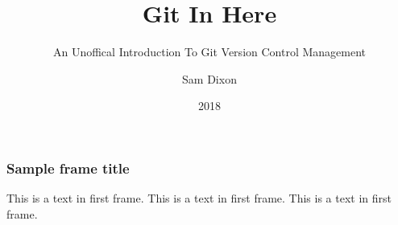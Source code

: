 \documentclass{beamer}
\title{Git In Here}
\subtitle{An Unoffical Introduction To Git Version Control Management}
\author{Sam Dixon}
\date{2018}
\begin{document}
 
\frame{\titlepage}
  
\begin{frame}

\frametitle{Sample frame title}
  This is a text in first frame. This is a text in first frame. This is a text
  in first frame.
\end{frame}
   
\end{document}

